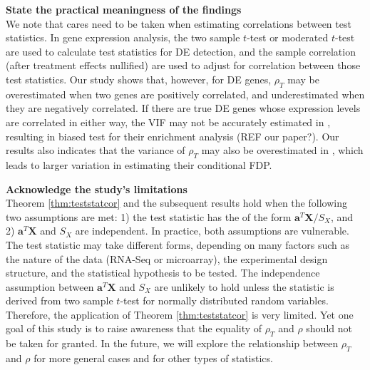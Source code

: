 \documentclass[12pt, a4paper]{article}
\begin{document}
	\textbf{State the practical meaningness of the findings}\\
	We note that cares need to be taken when estimating correlations between test statistics.
	In gene expression analysis, the two sample $t$-test \citep{barry2008statistical, efron2007correlation,qiu2005correlation} or moderated 
	$t$-test \citep{wu2012camera} are used to calculate test statistics for DE detection, and the sample correlation (after treatment effects 
	nullified) are used to adjust for correlation between those test statistics.
	Our study shows that, however, for DE genes, $\rho_T$ may be overestimated when
	two genes are positively correlated, and underestimated when they are negatively correlated. If there are true DE genes whose expression 
	levels are correlated in either way, the VIF may not be accurately estimated in \cite{wu2012camera}, resulting in biased test
	for their enrichment analysis (REF our paper?). Our results also indicates that the variance of $\rho_T$ may also be overestimated in
	\cite{efron2007correlation}, which leads to larger variation in estimating their conditional FDP.
	
	\textbf{	Acknowledge the study’s limitations \\}
	Theorem \ref{thm:teststatcor} and the subsequent results hold when the following two assumptions are met: 1) the test statistic has the of 
	the form $\bm a^T\bm X/S_X$, and 2) $\bm a^T\bm X$ and $S_X$ are independent. In practice, both assumptions are vulnerable.
	The test statistic may take different forms, depending on many factors such as the nature of the data (RNA-Seq or microarray), the 
	experimental design structure, and the statistical hypothesis to be tested. The independence assumption between $\bm a^T\bm X$ and $S_X$ are 
	unlikely to hold unless the statistic is derived from two sample $t$-test for normally distributed random variables. Therefore, the 
	application of Theorem \ref{thm:teststatcor} is very limited. Yet one goal of this study is to raise awareness that the equality of $\rho_T$ 
	and $\rho$ should not be taken for granted. In the future, we will explore the relationship between $\rho_T$ and $\rho$ for more general cases and for other types of statistics. 
	
	
	
	\newpage

	
	
	
	
\end{document}
